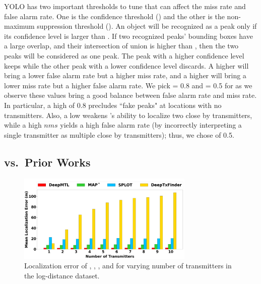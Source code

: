  YOLO has two important thresholds to tune that can affect the miss rate and false alarm rate. 
One is the confidence threshold (\conf) and the other is the non-maximum suppression threshold (\nms).
An object will be recognized as a peak only if its confidence level is larger than \conf.
If two recognized peaks' bounding boxes have a large overlap, and their intersection of union is higher than \nms, then the two peaks will be considered as one peak. 
The peak with a higher confidence level keeps while the other peak with a lower confidence level discards.
A higher \conf will bring a lower false alarm rate but a higher miss rate, and a higher \nms will bring a lower miss rate but a higher false alarm rate.
We pick \conf= 0.8 and \nms= 0.5 for \our as we observe these values bring a good balance between false alarm rate and miss rate.
In particular, a high \conf of 0.8  precludes ``fake peaks" at locations with no transmitters.
Also, a low \nms weakens \our's ability to localize two close by transmitters, while a high $nms$ yields
a high false alarm rate (by incorrectly interpreting a single transmitter as multiple close by transmitters); thus, we chose \nms of 0.5.




\subsection{\bf \our vs.\ Prior Works}
\label{subsec:vs_prior}

\begin{figure}[t]
	\centering
	\includegraphics[width=0.75\textwidth]{chapters/wowmom-pmc/figures/log_distance-error_vary_numintru.png}
    \vspace{-0.1in}
	\caption{Localization error of \our, \map, \splot, and \deeptx for varying number of transmitters in the log-distance dataset.}
	\label{fig:logdist-error-vary_numintru}
\end{figure}



